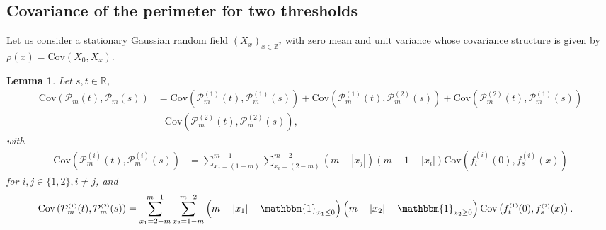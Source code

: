 \documentclass[12pt]{article}
\theoremstyle{Theorem}
\newtheorem{Lemma}[Theorem]{Lemma}
\begin{document}
\subsection{Covariance of the perimeter for two thresholds}
Let us consider a stationary Gaussian random field $\left(X_{\scriptscriptstyle x}\right)_{x \in \mathbb{Z}^{2}}$ with zero mean and unit variance whose covariance structure is given by $\rho(x) = \text{Cov}\left(X_{\scriptscriptstyle 0}, X_{\scriptscriptstyle x}\right)$.
\begin{Lemma} 
Let $s, t \in \mathbb{R}$, 
\label{CovLemma}
\begin{align}
\text{Cov}(\mathcal{P}_{m}(t), \mathcal{P}_{m}(s))  & = \text{Cov}(\mathcal{P}_{m}^{\scriptscriptstyle (1)}(t), \mathcal{P}_{m}^{\scriptscriptstyle (1)}(s)) + \text{Cov}(\mathcal{P}_{m}^{\scriptscriptstyle (1)}(t), \mathcal{P}_{m}^{\scriptscriptstyle (2)}(s)) + \text{Cov}(\mathcal{P}_{m}^{\scriptscriptstyle (2)}(t), \mathcal{P}_{m}^{\scriptscriptstyle (1)}(s)) \nonumber \\
& + \text{Cov}(\mathcal{P}_{m}^{\scriptscriptstyle (2)}(t), \mathcal{P}_{m}^{\scriptscriptstyle (2)}(s)),
\label{covariance}
\end{align} 
with 
\begin{align*}
\text{Cov}\left(\mathcal{P}_{m}^{\scriptscriptstyle (i)}(t),\mathcal{P}_{m}^{\scriptscriptstyle (i)}(s) \right) 
& = \sum_{x_{\scriptscriptstyle j}=\left(1-m\right)}^{m-1}\sum_{x_{\scriptscriptstyle i}=\left(2-m\right)}^{m-2}\left(m -|x_{j}|\right)\left(m - 1- |x_{i}|\right) \text{Cov}\left(f_{t}^{\scriptscriptstyle (i)}(0), f_{s}^{\scriptscriptstyle (i)}(x) \right) 
\end{align*} 
for $i,j \in\{1,2\}, i\neq j$, and 
\begin{align*}
\text{Cov}\left(\mathcal{P}_{m}^{\scriptscriptstyle (1)}(t),\mathcal{P}_{m}^{\scriptscriptstyle (2)}(s) \right) 
& = \sum_{x_1=2-m}^{m-1} \sum_{x_2 = 1-m}^{m-2} \left(m-|x_1| - \mathbbm{1}_{x_{1} \leq 0}\right)\left(m-|x_2|-\mathbbm{1}_{x_{2} \geq 0}\right)\text{Cov}\left(f_{t}^{\scriptscriptstyle (1)}(0), f_{s}^{ \scriptscriptstyle (2)}(x) \right).
\end{align*}
\end{Lemma}
\end{document}
